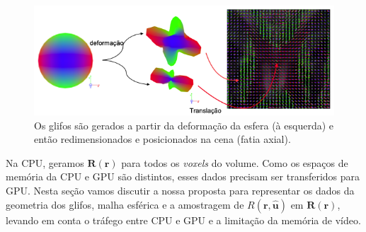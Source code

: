 \begin{figure}[htb]
    \centering
    \includegraphics[width=1.0\linewidth, angle=0]{figs/Esquema_Glifo/Renderizacao_multimodal.png}
    \caption{
    Os glifos são gerados a partir da deformação da esfera (à esquerda) e então redimensionados e posicionados na cena (fatia axial).
    }
    \label{fig::esfera_deformada_cena}
\end{figure}


Na CPU, geramos $\boldsymbol{R}(\mathbf{r})$ para todos os \textit{voxels} do volume. Como os espaços de memória da CPU e GPU são distintos, esses dados precisam ser transferidos para GPU. Nesta seção vamos discutir a nossa proposta para representar os dados da geometria dos glifos, malha esférica e a amostragem de $R(\mathbf{r}, \mathbf{\hat{u}})$ em $\boldsymbol{R}(\mathbf{r})$, levando em conta o tráfego entre CPU e GPU e a limitação da memória de vídeo.


